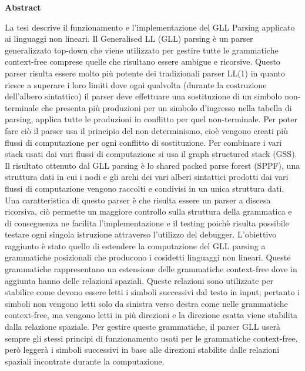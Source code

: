 \documentclass[12pt]{article}
\begin{document}
	\begin{center}
		{\huge\bf Abstract}\par
	\end{center}
	La tesi descrive il funzionamento e l'implementazione del GLL Parsing applicato ai linguaggi non lineari. Il Generalised LL (GLL) parsing è un parser generalizzato top-down che viene utilizzato per gestire tutte le grammatiche context-free comprese quelle che risultano essere ambigue e ricorsive. Questo parser risulta essere molto più potente dei tradizionali parser LL(1) in quanto riesce a superare i loro limiti dove ogni qualvolta (durante la costruzione dell'albero sintattico) il parser deve effettuare una sostituzione di un simbolo non-terminale che presenta più produzioni per un simbolo d'ingresso nella tabella di parsing, applica tutte le produzioni in conflitto per quel non-terminale. Per poter fare ciò il parser usa il principio del non determinismo, cioè vengono creati più flussi di computazione per ogni conflitto di sostituzione. Per combinare i vari stack usati dai vari flussi di computazione si usa il graph structured stack (GSS). Il risultato ottenuto dal GLL parsing è lo shared packed parse forest (SPPF), una struttura dati in cui i nodi e gli archi dei vari alberi sintattici prodotti dai vari flussi di computazione vengono raccolti e condivisi in un unica struttura dati. Una caratteristica di questo parser è che risulta essere un parser a discesa ricorsiva, ciò permette un maggiore controllo sulla struttura della grammatica e di conseguenza ne facilita l'implementazione e il testing poichè risulta possibile testare ogni singola istruzione attraverso l'utilizzo del debugger. L'obiettivo raggiunto è stato quello di estendere la computazione del GLL parsing a grammatiche posizionali che producono i cosidetti linguaggi non lineari. Queste grammatiche rappresentano un estensione delle grammatiche context-free dove in aggiunta hanno delle relazioni spaziali. Queste relazioni sono utilizzate per stabilire come devono essere letti i simboli successivi dal testo in input; pertanto i simboli non vengono letti solo da sinistra verso destra come nelle grammatiche context-free, ma vengono letti in più direzioni e la direzione esatta viene stabilita dalla relazione spaziale. Per gestire queste grammatiche, il parser GLL userà sempre gli stessi principi di funzionamento usati per le grammatiche context-free, però leggerà i simboli successivi in base alle direzioni stabilite dalle relazioni spaziali incontrate durante la computazione.
\end{document}
